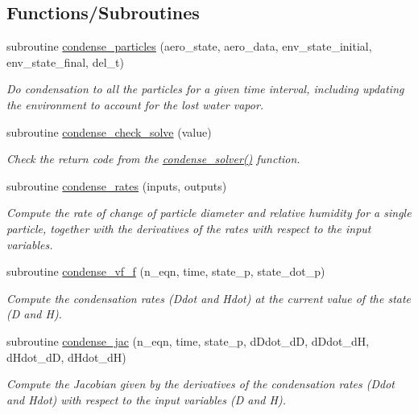 \subsection*{Functions/\+Subroutines}
\begin{DoxyCompactItemize}
\item 
subroutine \mbox{\hyperlink{namespacepmc__condense_a45e6b6e779962d0671313395a22a3ef6}{condense\+\_\+particles}} (aero\+\_\+state, aero\+\_\+data, env\+\_\+state\+\_\+initial, env\+\_\+state\+\_\+final, del\+\_\+t)
\begin{DoxyCompactList}\small\item\em Do condensation to all the particles for a given time interval, including updating the environment to account for the lost water vapor. \end{DoxyCompactList}\item 
subroutine \mbox{\hyperlink{namespacepmc__condense_afc45edd4ee290a743c722977accc1f5c}{condense\+\_\+check\+\_\+solve}} (value)
\begin{DoxyCompactList}\small\item\em Check the return code from the \mbox{\hyperlink{condense__solver_8c_a2b18e4f55610de6bcaf2a7eb954cf7aa}{condense\+\_\+solver()}} function. \end{DoxyCompactList}\item 
subroutine \mbox{\hyperlink{namespacepmc__condense_a2ec10eca18f9bc6bd906329e1574afef}{condense\+\_\+rates}} (inputs, outputs)
\begin{DoxyCompactList}\small\item\em Compute the rate of change of particle diameter and relative humidity for a single particle, together with the derivatives of the rates with respect to the input variables. \end{DoxyCompactList}\item 
subroutine \mbox{\hyperlink{namespacepmc__condense_a2e3c9253c59b92f29d8458f127e3014e}{condense\+\_\+vf\+\_\+f}} (n\+\_\+eqn, time, state\+\_\+p, state\+\_\+dot\+\_\+p)
\begin{DoxyCompactList}\small\item\em Compute the condensation rates (Ddot and Hdot) at the current value of the state (D and H). \end{DoxyCompactList}\item 
subroutine \mbox{\hyperlink{namespacepmc__condense_a31f63a235637d397e5f29aa2333db17d}{condense\+\_\+jac}} (n\+\_\+eqn, time, state\+\_\+p, d\+Ddot\+\_\+dD, d\+Ddot\+\_\+dH, d\+Hdot\+\_\+dD, d\+Hdot\+\_\+dH)
\begin{DoxyCompactList}\small\item\em Compute the Jacobian given by the derivatives of the condensation rates (Ddot and Hdot) with respect to the input variables (D and H). \end{DoxyCompactList}\item 

\end{DoxyCompactItemize}
